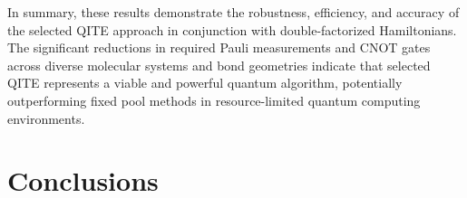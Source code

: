 \documentclass[aip,jcp,amsmath,amssymb, reprint]{revtex4-1}
\begin{document}
In summary, these results demonstrate the robustness, efficiency, and accuracy of the selected QITE approach in conjunction with double-factorized Hamiltonians. The significant reductions in required Pauli measurements and CNOT gates across diverse molecular systems and bond geometries indicate that selected QITE represents a viable and powerful quantum algorithm, potentially outperforming fixed pool methods in resource-limited quantum computing environments.
\section{Conclusions}


\end{document}
